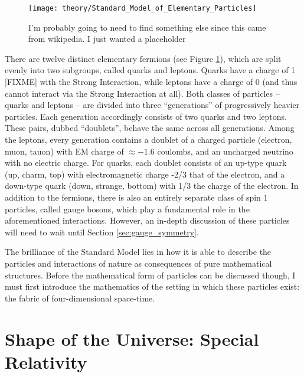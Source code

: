     \begin{figure}[h!]
        \texttt{[image: theory/Standard\_Model\_of\_Elementary\_Particles]}
        \caption{I'm probably going to need to find something else since this came from wikipedia. I just wanted a placeholder}
        \label{fig:sm_particles}
    \end{figure}

    There are twelve distinct elementary fermions (see Figure \ref{fig:sm_particles}),
        which are split evenly into two subgroups, called quarks and leptons.
    Quarks have a charge of 1 [FIXME] with the Strong Interaction,
        while leptons have a charge of 0 (and thus cannot interact via the Strong Interaction at all).
    Both classes of particles -- quarks and leptons -- are divided into three ``generations'' of progressively heavier particles.
    Each generation accordingly consists of two quarks and two leptons.
    These pairs, dubbed ``doublets'', behave the same across all generations.
    Among the leptons, every generation contains a doublet of a charged particle (electron, muon, tauon) with EM charge of $\approx −1.6$ coulombs,
        and an uncharged neutrino with no electric charge.
    For quarks, each doublet consists of an up-type quark (up, charm, top) with electromagnetic charge -2/3 that of the electron,
        and a down-type quark (down, strange, bottom) with 1/3 the charge of the electron.
    In addition to the fermions, there is also an entirely separate class of spin 1 particles, called gauge bosons,
        which play a fundamental role in the aforementioned interactions.
    However, an in-depth discussion of these particles will need to wait until Section \ref{sec:gauge_symmetry}.

    The brilliance of the Standard Model lies in how it is able to describe the 
        particles and interactions of nature as consequences of pure mathematical structures.
    Before the mathematical form of particles can be discussed though,
        I must first introduce the mathematics of the setting in which these particles exist:
        the fabric of four-dimensional space-time.


\FloatBarrier
\section{Shape of the Universe: Special Relativity}

